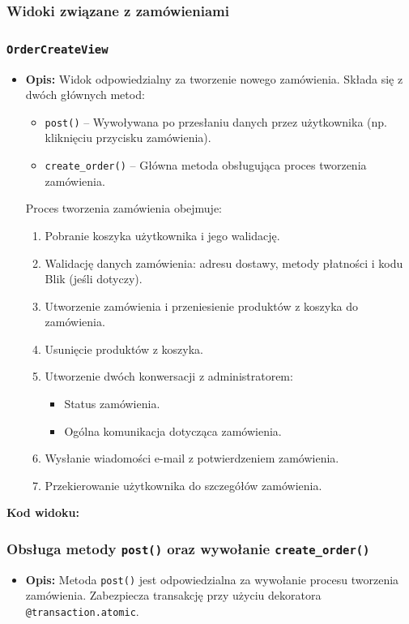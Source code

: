 \documentclass[12pt,a4paper,oneside]{article}
\theoremstyle{definition}
\numberwithin{equation}{section}
\begin{document}
\subsubsection{Widoki związane z zamówieniami}

\subsubsection*{\texttt{OrderCreateView}}
\begin{itemize}
    \item \textbf{Opis:} Widok odpowiedzialny za tworzenie nowego zamówienia. Składa się z dwóch głównych metod:
    \begin{itemize}
        \item \texttt{post()} – Wywoływana po przesłaniu danych przez użytkownika (np. kliknięciu przycisku zamówienia).
        \item \texttt{create\_order()} – Główna metoda obsługująca proces tworzenia zamówienia.
    \end{itemize}
    Proces tworzenia zamówienia obejmuje:
    \begin{enumerate}
        \item Pobranie koszyka użytkownika i jego walidację.
        \item Walidację danych zamówienia: adresu dostawy, metody płatności i kodu Blik (jeśli dotyczy).
        \item Utworzenie zamówienia i przeniesienie produktów z koszyka do zamówienia.
        \item Usunięcie produktów z koszyka.
        \item Utworzenie dwóch konwersacji z administratorem:
        \begin{itemize}
            \item Status zamówienia.
            \item Ogólna komunikacja dotycząca zamówienia.
        \end{itemize}
        \item Wysłanie wiadomości e-mail z potwierdzeniem zamówienia.
        \item Przekierowanie użytkownika do szczegółów zamówienia.
    \end{enumerate}
\end{itemize}

\textbf{Kod widoku:}

\subsubsection*{Obsługa metody \texttt{post()} oraz wywołanie \texttt{create\_order()}}
\begin{itemize}
    \item \textbf{Opis:} Metoda \texttt{post()} jest odpowiedzialna za wywołanie procesu tworzenia zamówienia. Zabezpiecza transakcję przy użyciu dekoratora \texttt{@transaction.atomic}.
\end{itemize}
\end{document}
